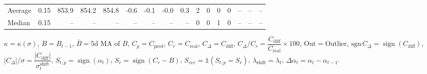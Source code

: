 \begin{threeparttable}
{\begin{tabular}{lrrrrrrrrrrrrrrr}
Average &     0.15 & 853.9 & 854.2 & 854.8 &       -0.6 &           -0.1 &                     -0.0 &                 0.3 &              2 &         0 &     0 &         0 &         -- &        -- &             -- \\
 Median &     0.15 &    -- &    -- &    -- &         -- &             -- &                       -- &                  -- &              0 &         0 &     1 &         0 &         -- &        -- &             -- \\
\bottomrule
\end{tabular}
}
\begin{tablenotes}\footnotesize
\item $\kappa=\kappa(\sigma)$, $B=B_{t-1}$, $\overline{B}=\text{5d MA of }B$, $C_p=C_{\text{pred}}$, $C_r=C_{\text{real}}$, $C_\Delta=C_{\text{diff}}$, $C_\Delta/C_r=\dfrac{C_{\text{diff}}}{C_{\text{real}}}\times100$, $\mathrm{Out}=\text{Outlier}$, $\mathrm{sgn}\,C_\Delta=\operatorname{sign}(C_{\text{diff}})$, $|C_\Delta|/\sigma=\dfrac{|C_{\text{diff}}|}{\sigma_t^{\text{shift}}}$, $S_{t,p}=\operatorname{sign}(\alpha_t)$, $S_r=\operatorname{sign}(C_r - B)$, $S_{ver}=\mathbb{1}(S_{t,p}=S_r)$, $\lambda_{\text{shift}}=\lambda_t$, $\Delta\alpha_t=\alpha_t-\alpha_{t-1}$.\end{tablenotes}
\end{threeparttable}
\endgroup


